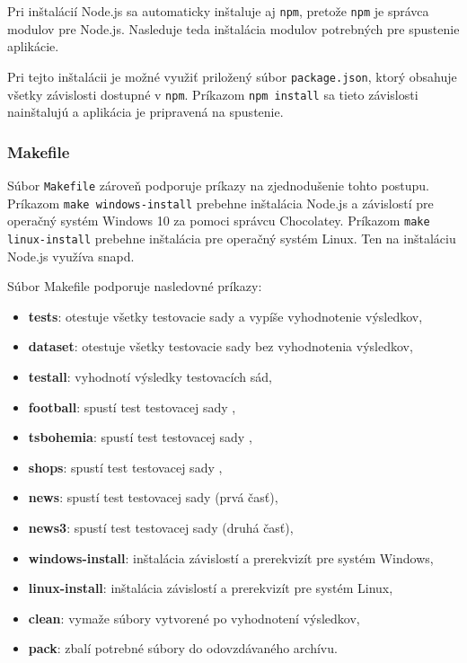 Pri inštalácií Node.js sa automaticky inštaluje aj \texttt{npm}, pretože \texttt{npm} je správca modulov pre Node.js. Nasleduje teda inštalácia modulov potrebných pre spustenie aplikácie.

Pri tejto inštalácii je možné využiť priložený súbor \texttt{package.json}, ktorý obsahuje všetky závislosti dostupné v \texttt{npm}. Príkazom \texttt{npm install} sa tieto závislosti nainštalujú a aplikácia je pripravená na spustenie.

\newpage

\subsubsection{Makefile}

Súbor \texttt{Makefile} zároveň podporuje príkazy na zjednodušenie tohto postupu. Príkazom \texttt{make windows-install} prebehne inštalácia Node.js a závislostí pre operačný systém Windows 10 za pomoci správcu Chocolatey. Príkazom \texttt{make linux-install} prebehne inštalácia pre operačný systém Linux. Ten na inštaláciu Node.js využíva snapd.

Súbor Makefile podporuje nasledovné príkazy:

\begin{itemize}
    \item \textbf{tests}: otestuje všetky testovacie sady a vypíše vyhodnotenie výsledkov,
    \item \textbf{dataset}: otestuje všetky testovacie sady bez vyhodnotenia výsledkov,
    \item \textbf{testall}: vyhodnotí výsledky testovacích sád,
    \item \textbf{football}: spustí test testovacej sady ,
    \item \textbf{tsbohemia}: spustí test testovacej sady ,
    \item \textbf{shops}: spustí test testovacej sady ,
    \item \textbf{news}: spustí test testovacej sady  (prvá časť),
    \item \textbf{news3}: spustí test testovacej sady  (druhá časť),
    \item \textbf{windows-install}: inštalácia závislostí a prerekvizít pre systém Windows,
    \item \textbf{linux-install}: inštalácia závislostí a prerekvizít pre systém Linux,
    \item \textbf{clean}: vymaže súbory vytvorené po vyhodnotení výsledkov,
    \item \textbf{pack}: zbalí potrebné súbory do odovzdávaného archívu.
\end{itemize}


